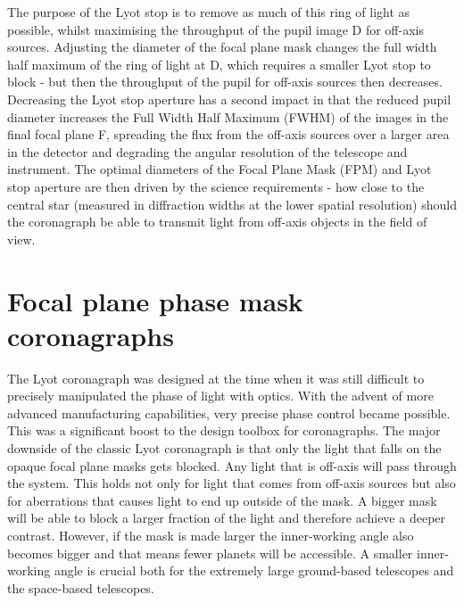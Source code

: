 \documentclass[letterpaper]{ar-1col}
\begin{document}
The purpose of the Lyot stop is to remove as much of this ring of light as possible, whilst maximising the throughput of the pupil image D for off-axis sources.
%
Adjusting the diameter of the focal plane mask changes the full width half maximum of the ring of light at D, which requires a smaller Lyot stop to block - but then the throughput of the pupil for off-axis sources then decreases.
%
Decreasing the Lyot stop aperture has a second impact in that the reduced pupil diameter increases the Full Width Half Maximum (FWHM) of the images in the final focal plane F, spreading the flux from the off-axis sources over a larger area in the detector and degrading the angular resolution of the telescope and instrument.
%
The optimal diameters of the Focal Plane Mask (FPM) and Lyot stop aperture are then driven by the science requirements - how close to the central star (measured in diffraction widths at the lower spatial resolution) should the coronagraph be able to transmit light from off-axis objects in the field of view.



\section{Focal plane phase mask coronagraphs}
The Lyot coronagraph was designed at the time when it was still difficult to precisely manipulated the phase of light with optics.
%
With the advent of more advanced manufacturing capabilities, very precise phase control became possible.
%
This was a significant boost to the design toolbox for coronagraphs.
%
The major downside of the classic Lyot coronagraph is that only the light that falls on the opaque focal plane masks gets blocked.
%
Any light that is off-axis will pass through the system.
%
This holds not only for light that comes from off-axis sources but also for aberrations that causes light to end up outside of the mask.
%
A bigger mask will be able to block a larger fraction of the light and therefore achieve a deeper contrast.
%
However, if the mask is made larger the inner-working angle also becomes bigger and that means fewer planets will be accessible.
%
A smaller inner-working angle is crucial both for the extremely large ground-based telescopes and the space-based telescopes. 
\end{document}
